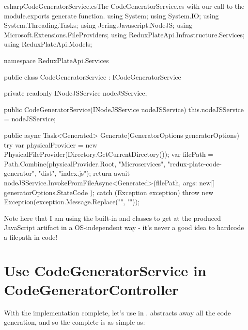 \documentclass[paper=6in:9in,pagesize=pdftex,headinclude=on,footinclude=on,12pt,twoside]{scrbook}
\begin{document}
\begin{codeInput}{csharp}{CodeGeneratorService.cs}{The CodeGeneratorService.cs with our call to the module.exports generate function.}
using System;
using System.IO;
using System.Threading.Tasks;
using Jering.Javascript.NodeJS;
using Microsoft.Extensions.FileProviders;
using ReduxPlateApi.Infrastructure.Services;
using ReduxPlateApi.Models;

namespace ReduxPlateApi.Services
{
    public class CodeGeneratorService : ICodeGeneratorService
    {
        private readonly INodeJSService nodeJSService;

        public CodeGeneratorService(INodeJSService nodeJSService)
        {
            this.nodeJSService = nodeJSService;
        }

        public async Task<Generated> Generate(GeneratorOptions generatorOptions)
        {
            try
            {
                var physicalProvider = new PhysicalFileProvider(Directory.GetCurrentDirectory());
                var filePath = Path.Combine(physicalProvider.Root, "Microservices", "redux-plate-code-generator", "dist", "index.js");
                return await nodeJSService.InvokeFromFileAsync<Generated>(filePath, args: new[] { generatorOptions.StateCode });
            }
            catch (Exception exception)
            {
                throw new Exception(exception.Message.Replace("\n", ""));
            }
        }
    }
}  
\end{codeInput}

Note here that I am using the built-in  and  classes to get at the produced JavaScript artifact in a OS-independent way - it's never a good idea to hardcode a filepath in code!

\section{Use CodeGeneratorService in CodeGeneratorController}

With the implementation complete, let's use  in .  abstracts away all the code generation, and so the complete  is as simple as:
\end{document}

